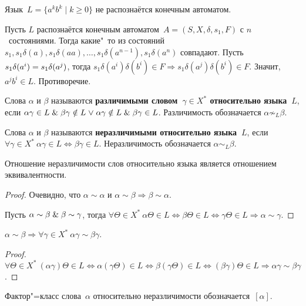 \begin{theorem}
Язык~$L = \{ a^k b^k \mid k \geqslant 0 \}$ не распознаётся конечным автоматом.
\end{theorem}
\begin{proofcontra}
Пусть $L$ распознаётся конечным автоматом~$A = (S, X, \delta, s_1, F)$ с $n$~состояниями.
Тогда какие"~то из состояний $s_1, s_1 \delta(a), s_1 \delta(aa), \ldots, s_1 \delta(a^{n-1}), s_1 \delta(a^n)$ совпадают.
Пусть $s_1 \delta(a^i) \opbr= s_1 \delta(a^j)$, тогда $s_1 \delta(a^i) \delta(b^i) \in F \Rightarrow
s_1 \delta(a^j) \delta(b^i) \in F$.
Значит, $a^j b^i \in L$.
Противоречие.
\end{proofcontra}

Слова $\alpha$ и $\beta$ называются \textbf{различимыми словом~$\gamma \in X^*$ относительно языка~$L$}, если $\alpha \gamma \in L \opbr\lAnd \beta \gamma \notin L \opbr\lOr \alpha \gamma \notin L \opbr\lAnd \beta \gamma \in L$.
Различимость обозначается $\alpha \not\sim_L \beta$.

Слова $\alpha$ и $\beta$ называются \textbf{неразличимыми относительно языка~$L$}, если $\forall \gamma \in X^* \ \alpha \gamma \in L \Leftrightarrow \beta \gamma \in L$.
Неразличимость обозначается $\alpha \sim_L \beta$.

\begin{statement}
Отношение неразличимости слов относительно языка является отношением эквивалентности.
\end{statement}
\begin{proof}
Очевидно, что $\alpha \sim \alpha$ и $\alpha \sim \beta \Rightarrow \beta \sim \alpha$.

Пусть $\alpha \sim \beta \mathrel{\&} \beta \sim \gamma$, тогда $\forall \Theta \in X^* \ 
\alpha \Theta \in L \Leftrightarrow
\beta \Theta \in L \Leftrightarrow
\gamma \Theta \in L \Rightarrow
\alpha \sim \gamma$.
\end{proof}

\begin{statement}
$\alpha \sim \beta \Rightarrow \forall \gamma \in X^* \ \alpha \gamma \sim \beta \gamma$.
\end{statement}
\begin{proof}
$\forall \Theta \in X^* \ (\alpha \gamma) \Theta \in L \Leftrightarrow
\alpha (\gamma \Theta) \in L \Leftrightarrow
\beta (\gamma \Theta) \in L \Leftrightarrow
(\beta \gamma) \Theta \in L \Rightarrow
\alpha \gamma \sim \beta \gamma$.
\end{proof}

Фактор"=класс слова~$\alpha$ относительно неразличимости обозначается~$[\alpha]$.

